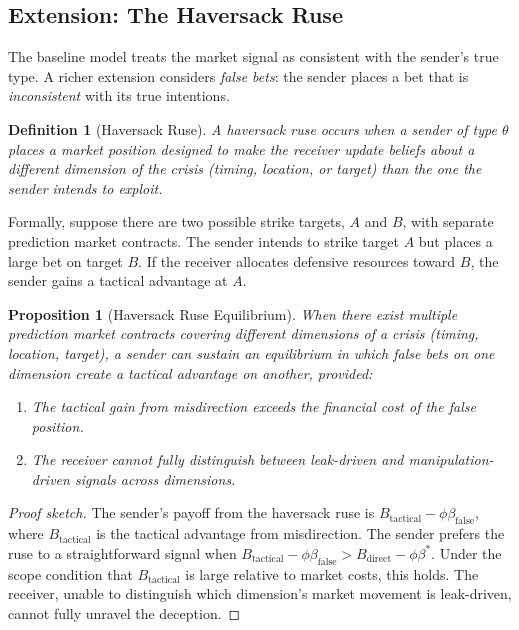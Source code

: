 \documentclass[12pt]{article}
\newtheorem{proposition}{Proposition}
\newtheorem{definition}{Definition}
\begin{document}
\subsection{Extension: The Haversack Ruse}

The baseline model treats the market signal as consistent with the sender's true type. A richer extension considers \textit{false bets}: the sender places a bet that is \textit{inconsistent} with its true intentions.

\begin{definition}[Haversack Ruse]
A haversack ruse occurs when a sender of type $\theta$ places a market position designed to make the receiver update beliefs about a \textit{different} dimension of the crisis (timing, location, or target) than the one the sender intends to exploit.
\end{definition}

Formally, suppose there are two possible strike targets, $A$ and $B$, with separate prediction market contracts. The sender intends to strike target $A$ but places a large bet on target $B$. If the receiver allocates defensive resources toward $B$, the sender gains a tactical advantage at $A$.

\begin{proposition}[Haversack Ruse Equilibrium]\label{prop:haversack}
When there exist multiple prediction market contracts covering different dimensions of a crisis (timing, location, target), a sender can sustain an equilibrium in which false bets on one dimension create a tactical advantage on another, provided:
\begin{enumerate}[label=(\alph*)]
    \item The tactical gain from misdirection exceeds the financial cost of the false position.
    \item The receiver cannot fully distinguish between leak-driven and manipulation-driven signals across dimensions.
\end{enumerate}
\end{proposition}

\begin{proof}[Proof sketch]
The sender's payoff from the haversack ruse is $B_{\text{tactical}} - \phi\beta_{\text{false}}$, where $B_{\text{tactical}}$ is the tactical advantage from misdirection. The sender prefers the ruse to a straightforward signal when $B_{\text{tactical}} - \phi\beta_{\text{false}} > B_{\text{direct}} - \phi\beta^*$. Under the scope condition that $B_{\text{tactical}}$ is large relative to market costs, this holds. The receiver, unable to distinguish which dimension's market movement is leak-driven, cannot fully unravel the deception.
\end{proof}
\end{document}
